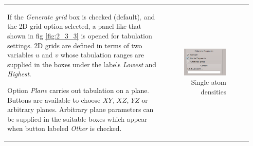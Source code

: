 \documentclass[10pt]{article}
\begin{document}
\begin{tabular}{lr}
\hspace*{-3mm}
\begin{minipage}{.6\linewidth}

If the {\it Generate grid} box is checked (default), and the 2D grid option
selected, a panel like that shown in fig  \ref{fig:2_3_3} is opened for tabulation
settings. 2D grids\index{2D grid!grid definition} are defined in terms of two
variables $u$ and $v$ whose tabulation ranges are supplied in the boxes under
the labels {\it Lowest} and {\it Highest}.

Option {\it Plane} carries out tabulation on a plane. 
Buttons are available to choose $XY$, $XZ$, $YZ$ or arbitrary planes.
Arbitrary plane parameters can be supplied in the suitable boxes which
appear when button labeled {\it Other} is checked.
\end{minipage}
&
\begin{minipage}{.4\linewidth}
\vspace*{-0.3cm}
\begin{figure}[H]
\vspace*{-0.5cm}
\begin{center}
\includegraphics[width=.55\linewidth]{damqt_fig_2_3_2.png}
\end{center}
\caption{Single atom densities \label{fig:2_3_2}}
\end{figure}
\end{minipage}
\end{tabular}

\end{document}
